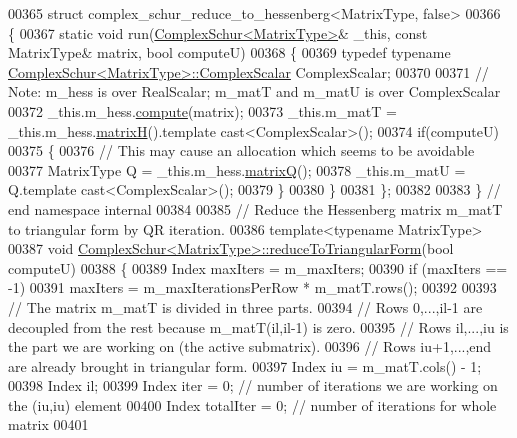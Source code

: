 \begin{DoxyCode}
00365 \textcolor{keyword}{struct }complex\_schur\_reduce\_to\_hessenberg<MatrixType, false>
00366 \{
00367   \textcolor{keyword}{static} \textcolor{keywordtype}{void} run(\hyperlink{group___eigenvalues___module}{ComplexSchur<MatrixType>}& \_this, \textcolor{keyword}{const} MatrixType& matrix, \textcolor{keywordtype}{bool} 
      computeU)
00368   \{
00369     \textcolor{keyword}{typedef} \textcolor{keyword}{typename} \hyperlink{group___eigenvalues___module_class_eigen_1_1_complex_schur}{ComplexSchur<MatrixType>::ComplexScalar} 
      ComplexScalar;
00370 
00371     \textcolor{comment}{// Note: m\_hess is over RealScalar; m\_matT and m\_matU is over ComplexScalar}
00372     \_this.m\_hess.\hyperlink{group___eigenvalues___module_a239a6fd42c57aab3c0b048c47fde3004}{compute}(matrix);
00373     \_this.m\_matT = \_this.m\_hess.\hyperlink{group___eigenvalues___module_a8e781d2e22a2304647bcf0ae913cc8ea}{matrixH}().template cast<ComplexScalar>();
00374     \textcolor{keywordflow}{if}(computeU)  
00375     \{
00376       \textcolor{comment}{// This may cause an allocation which seems to be avoidable}
00377       MatrixType Q = \_this.m\_hess.\hyperlink{group___eigenvalues___module_a346441e4902a58d43d698ac3da6ff791}{matrixQ}(); 
00378       \_this.m\_matU = Q.template cast<ComplexScalar>();
00379     \}
00380   \}
00381 \};
00382 
00383 \} \textcolor{comment}{// end namespace internal}
00384 
00385 \textcolor{comment}{// Reduce the Hessenberg matrix m\_matT to triangular form by QR iteration.}
00386 \textcolor{keyword}{template}<\textcolor{keyword}{typename} MatrixType>
00387 \textcolor{keywordtype}{void} \hyperlink{group___eigenvalues___module_class_eigen_1_1_complex_schur}{ComplexSchur<MatrixType>::reduceToTriangularForm}(\textcolor{keywordtype}{bool} 
      computeU)
00388 \{  
00389   Index maxIters = m\_maxIters;
00390   \textcolor{keywordflow}{if} (maxIters == -1)
00391     maxIters = m\_maxIterationsPerRow * m\_matT.rows();
00392 
00393   \textcolor{comment}{// The matrix m\_matT is divided in three parts. }
00394   \textcolor{comment}{// Rows 0,...,il-1 are decoupled from the rest because m\_matT(il,il-1) is zero. }
00395   \textcolor{comment}{// Rows il,...,iu is the part we are working on (the active submatrix).}
00396   \textcolor{comment}{// Rows iu+1,...,end are already brought in triangular form.}
00397   Index iu = m\_matT.cols() - 1;
00398   Index il;
00399   Index iter = 0; \textcolor{comment}{// number of iterations we are working on the (iu,iu) element}
00400   Index totalIter = 0; \textcolor{comment}{// number of iterations for whole matrix}
00401 

\end{DoxyCode}
